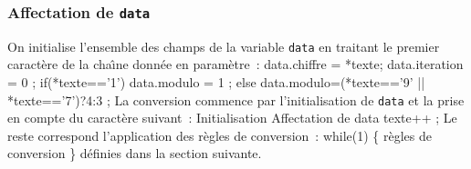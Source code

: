 \begin{correction}
\subsubsection*{Affectation de {\tt{}data}}

\nwenddocs{}\nwdocspar
On initialise l'ensemble des champs de la variable {\tt{}data} en
traitant le premier caract\`ere de la cha\^\i{}ne donn\'ee en
param\`etre~:
\nwenddocs{}\endmoddef
data.chiffre = *texte;
data.iteration = 0 ;
if(*texte=='1')
  data.modulo = 1 ;
else 
  data.modulo=(*texte=='9' || *texte=='7')?4:3 ;
\eatline
\nwendcode{}\nwdocspar
\nwenddocs{}\nwdocspar
La conversion commence par l'initialisation de {\tt{}data}
et la prise en compte du caract\`ere suivant~:
\nwenddocs{}\endmoddef
\LA{}Initialisation\RA{}
\LA{}Affectation de data\RA{}
texte++ ;
\eatline
\nwendcode{}\nwdocspar
\nwenddocs{}\nwdocspar
Le reste correspond l'application des r\`egles de conversion~:
\nwenddocs{}\plusendmoddef
while(1)
\{
\LA{}r\`egles de conversion\RA{}
\}
\eatline
\nwendcode{}d\'efinies dans la section suivante.
\nwenddocs{}\nwdocspar

\end{correction}
